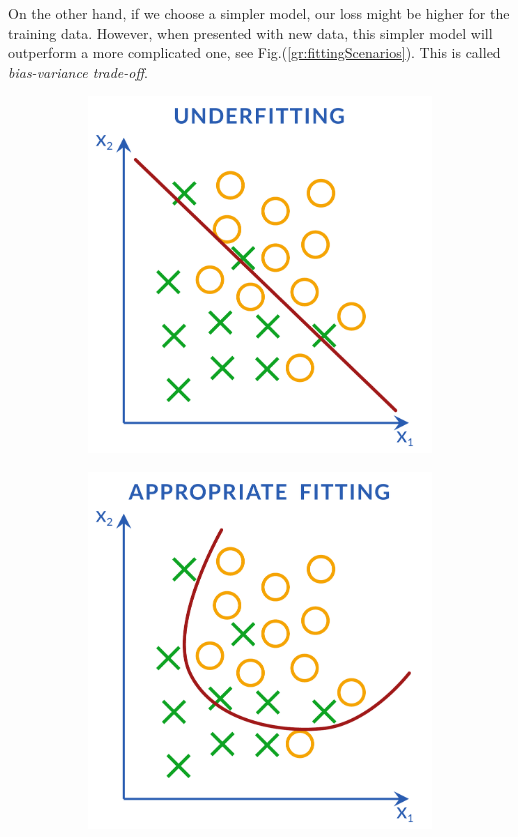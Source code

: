\par
On the other hand, if we choose a simpler model, our loss might be higher for the training data. However, when presented with new data, this simpler model will outperform a more complicated one, see Fig.(\ref{gr:fittingScenarios}). This is called \textit{bias-variance trade-off}.
\begin{figure}[h]
	\centering
	\begin{subfigure}{0.33\textwidth}
		\centering
		\includegraphics[width=\columnwidth]{figures/introduction/underfitting.pdf}
	\end{subfigure}%
	\begin{subfigure}{0.33\textwidth}
		\centering
		\includegraphics[width=\columnwidth]{figures/introduction/appropriate .pdf}

\end{subfigure}
\end{figure}
